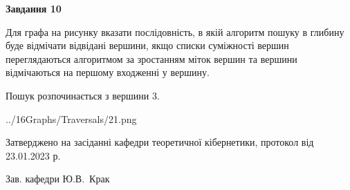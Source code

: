 \documentclass[12pt, ukrainian]{article}
\begin{document}
{\begin {large}
{\begin {center}\textbf{Завдання 10}\end {center}}\par
Для графа на рисунку вказати послідовність, в якій алгоритм пошуку в глибину буде відмічати відвідані вершини, якщо списки суміжності вершин переглядаються алгоритмом за зростанням міток вершин та вершини відмічаються на першому вход\-женні у вершину.\par
Пошук розпочинається з вершини 3.\par

\begin{center}
	{../16Graphs/Traversals/21.png}
\end{center}\par
\newpage


\end {large}
}
{\smallskip \begin {small} Затверджено на засіданні кафедри теоретичної кібернетики, протокол  від   23.01.2023 р.\par\smallskip\smallskip
{\parbox {6.5 cm}{Зав. кафедри \dotfill Ю.В.~Крак}} \end{small}}
\end{document}
